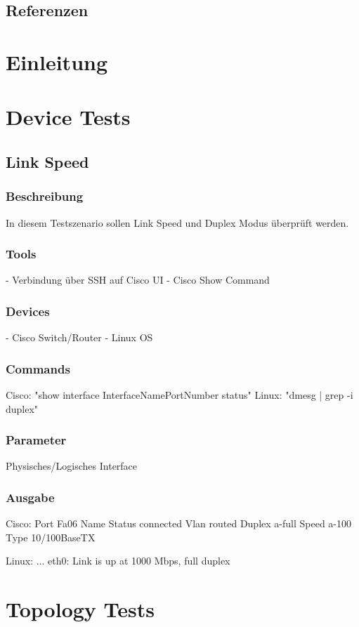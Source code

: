 \documentclass[a4,12pt]{scrartcl}
\begin{document}
\subsection{Referenzen}

\newpage
\section{Einleitung}

\newpage
\section{Device Tests}
\subsection{Link Speed}
\subsubsection{Beschreibung}
In diesem Testszenario sollen Link Speed und Duplex Modus überprüft werden.
\subsubsection{Tools}
- Verbindung über SSH auf Cisco UI
- Cisco Show Command
\subsubsection{Devices}
- Cisco Switch/Router
- Linux OS
\subsubsection{Commands}
Cisco: "show interface InterfaceNamePortNumber status"
Linux: "dmesg | grep -i duplex"
\subsubsection{Parameter}
Physisches/Logisches Interface
\subsubsection{Ausgabe}
Cisco: Port Fa06	Name 	Status connected	Vlan routed	Duplex a-full	Speed a-100	Type 10/100BaseTX

Linux: ... eth0: Link is up at 1000 Mbps, full duplex




\newpage
\section{Topology Tests}
\end{document}
